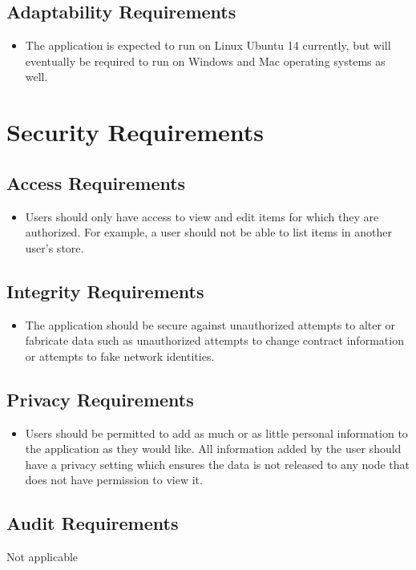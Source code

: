 \documentclass{article}
\begin{document}
\subsection{Adaptability Requirements}
\begin{itemize}
\item
The application is expected to run on Linux Ubuntu 14 currently, but will eventually be required to run on Windows and Mac operating systems as well.
\end{itemize}

\section{Security Requirements}
\subsection{Access Requirements}
\begin{itemize}
\item 
Users should only have access to view and edit items for which they are authorized. For example, a user should not be able to list items in another user's store.       
\end{itemize}
\subsection{Integrity Requirements}
\begin{itemize}
 \item 
 The application should be secure against unauthorized attempts to alter or fabricate data such as unauthorized attempts to change contract information or attempts to fake network identities.          
\end{itemize}

\subsection{Privacy Requirements}
\begin{itemize}
\item 
Users should be permitted to add as much or as little personal information to the application as they would like. All information added by the user should have a privacy setting which ensures the data is not released to any node that does not have permission to view it.          
\end{itemize}

\subsection{Audit Requirements}
Not applicable
\end{document}
